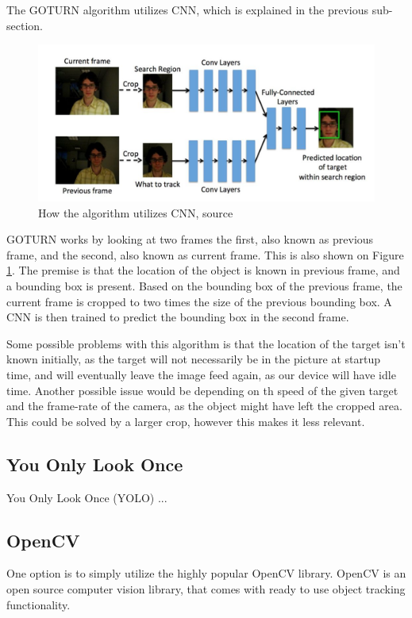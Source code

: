 The GOTURN algorithm utilizes CNN, which is explained in the previous sub-section.
\begin{figure}[H]
	\centering
	\includegraphics[scale=0.80]{images/GOTURN-architecture.jpg}
	\caption{
		How the algorithm utilizes CNN, source \cite{goturn}
	}
	\label{fig:goturn-arch}
\end{figure}
GOTURN works by looking at two frames the first, also known as previous frame, and the second, also known as current frame.
This is also shown on Figure \ref{fig:goturn-arch}.
The premise is that the location of the object is known in previous frame, and a bounding box is present.
Based on the bounding box of the previous frame, the current frame is cropped to two times the size of the previous bounding box.
A CNN is then trained to predict the bounding box in the second frame.


Some possible problems with this algorithm is that the location of the target isn't known initially, as the target will not necessarily be in the picture at startup time, and will eventually leave the image feed again, as our device will have idle time.
Another possible issue would be depending on th speed of the given target and the frame-rate of the camera, as the object might have left the cropped area. 
This could be solved by a larger crop, however this makes it less relevant.

\subsection{You Only Look Once}
You Only Look Once (YOLO) ...



\subsection{OpenCV}
One option is to simply utilize the highly popular OpenCV library.
OpenCV is an open source computer vision library, that comes with ready to use object tracking functionality.




